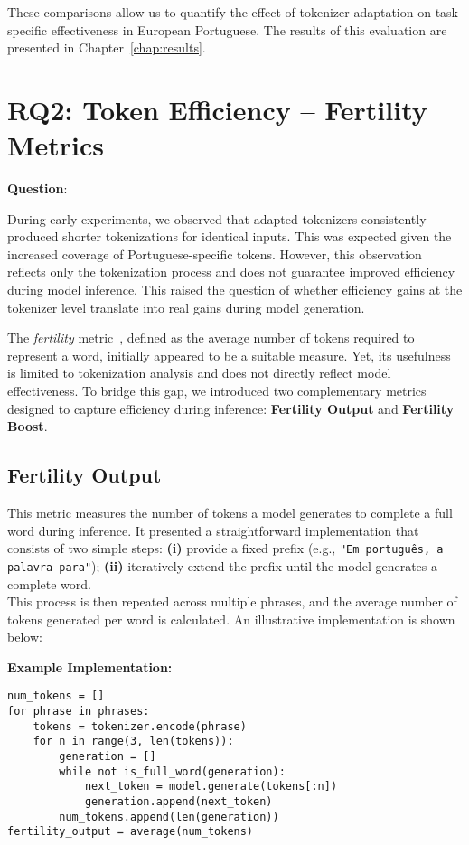 These comparisons allow us to quantify the effect of tokenizer adaptation on task-specific effectiveness in European Portuguese. The results of this evaluation are presented in Chapter~\ref{chap:results}.



\section{RQ2: Token Efficiency – Fertility Metrics}
\label{sec:fertility_metric}
\textbf{Question}: \textit{\RQtwo}

During early experiments, we observed that adapted tokenizers consistently produced shorter tokenizations for identical inputs. This was expected given the increased coverage of Portuguese-specific tokens. However, this observation reflects only the tokenization process and does not guarantee improved efficiency during model inference. This raised the question of whether efficiency gains at the tokenizer level translate into real gains during model generation.

The \textit{fertility} metric~\cite{ali2024tokenizer, csaki2023efficiently}, defined as the average number of tokens required to represent a word, initially appeared to be a suitable measure. Yet, its usefulness is limited to tokenization analysis and does not directly reflect model effectiveness. To bridge this gap, we introduced two complementary metrics designed to capture efficiency during inference: \textbf{Fertility Output} and \textbf{Fertility Boost}.


\subsection*{\textbf{Fertility Output}}
\label{subsec:fertility_output}

This metric measures the number of tokens a model generates to complete a full word during inference.
It presented a straightforward implementation that consists of two simple steps:
\textbf{(i)} provide a fixed prefix (e.g., \texttt{"Em português, a palavra para"});  
\textbf{(ii)} iteratively extend the prefix until the model generates a complete word. \\
This process is then repeated across multiple phrases, and the average number of tokens generated per word is calculated. An illustrative implementation is shown below:

\textbf{Example Implementation:}
\begin{lstlisting}
num_tokens = []
for phrase in phrases:
    tokens = tokenizer.encode(phrase)
    for n in range(3, len(tokens)):
        generation = []
        while not is_full_word(generation):
            next_token = model.generate(tokens[:n])
            generation.append(next_token)
        num_tokens.append(len(generation))
fertility_output = average(num_tokens)
\end{lstlisting}

